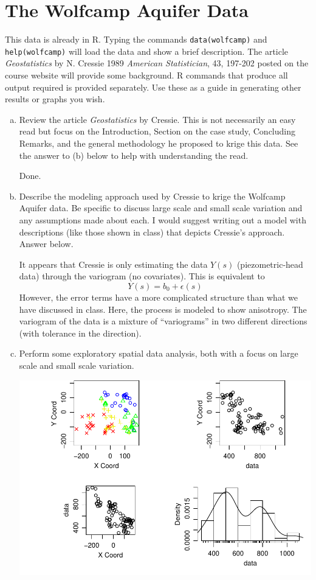 \documentclass[letterpaper, 12pt]{article}\usepackage[]{graphicx}\usepackage[]{color}
\makeatletter
\def\maxwidth{ %
  \ifdim\Gin@nat@width>\linewidth
    \linewidth
  \else
    \Gin@nat@width
  \fi
}
\newenvironment{knitrout}{}{} %
\makeatother
\begin{document}
\section{The Wolfcamp Aquifer Data}

This data is already in R. Typing the commands \texttt{data(wolfcamp)} and \texttt{help(wolfcamp)} will load the data and show a brief description. The article \textit{Geostatistics} by N. Cressie 1989 \textit{American Statistician}, 43, 197-202 posted on the course website will provide some background. R commands that produce all output required is provided separately. Use these as a guide in generating other results or graphs you wish.

\begin{enumerate}[a.]
\item
Review the article \textit{Geostatistics} by Cressie. This is not necessarily an easy read but focus on the Introduction, Section on the case study, Concluding Remarks, and the general methodology he proposed to krige this data. See the answer to (b) below to help with understanding the read.

\textsf{Done.}

\item
Describe the modeling approach used by Cressie to krige the Wolfcamp Aquifer data. Be specific to discuss large scale and small scale variation and any assumptions made about each. I would suggest writing out a model with descriptions (like those shown in class) that depicts Cressie’s approach. Answer below.

{\sf
It appears that Cressie is only estimating the data $Y(s)$ (piezometric-head data) through the variogram (no covariates). This is equivalent to 
\[
Y(s) = b_0 + \epsilon(s)
\]
However, the error terms have a more complicated structure than what we have discussed in class. Here, the process is modeled to show anisotropy. The variogram of the data is a mixture of ``variograms'' in two different directions (with tolerance in the direction).
}

\item
Perform some exploratory spatial data analysis, both with a focus on large scale and small scale variation.

\begin{knitrout}
\color{fgcolor}
\includegraphics[width=\maxwidth]{figure/wolfcamp2} 


\end{knitrout}
\end{enumerate}
\end{document}

